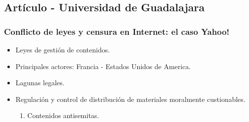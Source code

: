 \documentclass{beamer}
\begin{document}
\subsection{Art\'iculo - Universidad de Guadalajara}
\frame
{
\transdissolve[duration=0.2]
\frametitle{Conflicto de leyes y censura en Internet: el caso Yahoo!}
\begin{itemize}
	\item Leyes de gesti\'on de contenidos.
	\item Principales actores: Francia - Estados Unidos de America.
	\item Lagunas legales.
	\item Regulaci\'on y control de distribuci\'on de materiales moralmente custionables.
	\begin{enumerate}
		\item Contenidos antisemitas.
	\end{enumerate}
\end{itemize}
}
\end{document}
